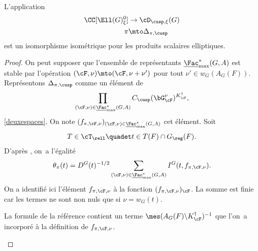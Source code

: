 \begin{prop*}
L'application
\begin{align*}
\CC[\Ell(G)_{\xi}^0]&\to \cD_{\cusp,\xi}(G)\\
\pi&\mto \Delta_{\pi,\cusp}
\end{align*}
est un isomorphisme isométrique pour les produits scalaires elliptiques.
\end{prop*}

\begin{proof}
On peut supposer que l'ensemble de représentants $\underline{\Fac}^*_{\max}(G,A)$ est stable par l'opération $(\cF,\nu)\mto (\cF,\nu+\nu')$ pour tout $\nu'\in w_{G}(A_{G}(F))$. Représentons $\Delta_{\pi,\cusp}$ comme un élément de
\[
\prod_{(\cF,\nu)\in \underline{\Fac}^*_{\max}(G,A)}C_{\cusp}(\bG_{\cF}^{\nu})^{K_{\cF}^{\dag}},
\]
\cf \ref{deuxespaces}. On note $(f_{\pi,\cF,\nu})_{(\cF,\nu)\in \underline{\Fac}^*_{\max}(G,A)}$ cet élément.
Soit
\[
T\in \cT_{\rell}\quadet t\in T(F)\cap G_{\reg}(F).
\]
D'après \cite[18(3)]{W2}, on~a l'égalité
\[
\theta_{\pi}(t)=D^G(t)^{-1/2}\sum_{(\cF,\nu)\in \underline{\Fac}^*_{\max}(G,A)} I^G(t,f_{\pi,\cF,\nu}).
\]
On a identifié ici l'élément $f_{\pi,\cF,\nu}$ à la fonction $(f_{\pi,\cF,\nu})_{\cF}$. La somme est finie car les termes ne sont non nuls que si $\nu=w_{G}(t)$.

\begin{rem*}
La formule de la référence contient un terme $\mes(A_{G}(F)\backslash K_{\cF}^{\dag})^{-1}$ que l'on~a incorporé à la définition de $f_{\pi,\cF,\nu}$.
\end{rem*}


\end{proof}
